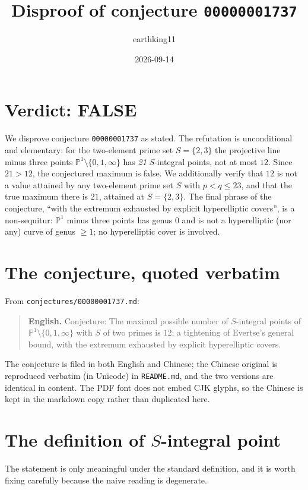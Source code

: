 \documentclass[11pt]{article}
\title{Disproof of conjecture \texttt{00000001737}}
\author{earthking11}
\date{2026-09-14}
\theoremstyle{definition}
\theoremstyle{remark}
\newcommand{\PP}{\mathbb{P}}
\begin{document}
\maketitle

\section*{Verdict: FALSE}

We disprove conjecture \texttt{00000001737} as stated. The refutation is
unconditional and elementary: for the two-element prime set $S=\{2,3\}$ the
projective line minus three points $\PP^1\setminus\{0,1,\infty\}$ has
\emph{21} $S$-integral points, not at most $12$. Since
$21 > 12$, the conjectured maximum is false. We additionally verify that
$12$ is not a value attained by any two-element prime set $S$ with
$p<q\le 23$, and that the true maximum there is $21$, attained at
$S=\{2,3\}$. The final phrase of the conjecture, ``with the extremum exhausted
by explicit hyperelliptic covers'', is a non-sequitur: $\PP^1$ minus three
points has genus $0$ and is not a hyperelliptic (nor any) curve of genus
$\ge 1$; no hyperelliptic cover is involved.

\section{The conjecture, quoted verbatim}

From \texttt{conjectures/00000001737.md}:

\begin{quote}
\textbf{English.} Conjecture: The maximal possible number of $S$-integral
points of $\PP^1\setminus\{0,1,\infty\}$ with $S$ of two primes is $12$; a
tightening of Evertse's general bound, with the extremum exhausted by explicit
hyperelliptic covers.
\end{quote}

The conjecture is filed in both English and Chinese; the Chinese original is
reproduced verbatim (in Unicode) in \texttt{README.md}, and the two versions are
identical in content. The PDF font does not embed CJK glyphs, so the Chinese is
kept in the markdown copy rather than duplicated here.

\section{The definition of $S$-integral point}

The statement is only meaningful under the standard definition, and it is worth
fixing carefully because the naive reading is degenerate.
\end{document}
